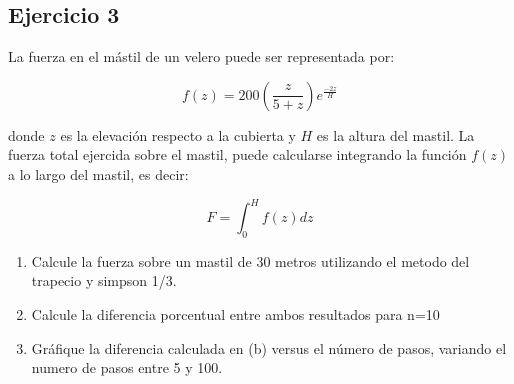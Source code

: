 \documentclass[a4paper,11pt]{article}
\theoremstyle{mytheor}
\begin{document}
\subsection*{Ejercicio 3} La fuerza en el mástil de un velero puede ser representada por:

\begin{equation*}
f(z)=200\left(\dfrac{z}{5+z}\right)e^{\tfrac{-2z}{H}}   
\end{equation*}


\noindent donde $z$ es la elevación respecto a la cubierta y $H$ es la altura del mastil. La fuerza total ejercida sobre el mastil, puede calcularse integrando la función $f(z)$ a lo largo del mastil, es decir:

\begin{equation*}
    F=\int_{0}^{H}f(z)dz
\end{equation*}

\begin{enumerate}[label=\alph*)]
    \item Calcule la fuerza sobre un mastil de 30 metros utilizando el metodo del trapecio y simpson 1/3. 
    \item Calcule la diferencia porcentual entre ambos resultados para n=10
    \item Gráfique la diferencia calculada en (b) versus el número de pasos, variando el numero de pasos entre 5 y 100.
\end{enumerate} 
\end{document}
